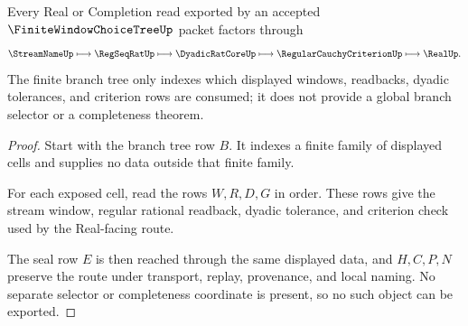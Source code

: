 \begin{theorem}
\label{thm:finite-window-choice-tree-real-handoff}
Every Real or Completion read exported by an accepted $\FiniteWindowChoiceTreeUp$ packet factors through
$$
\StreamNameUp \longmapsto \RegSeqRatUp \longmapsto \DyadicRatCoreUp \longmapsto \RegularCauchyCriterionUp \longmapsto \RealUp .
$$
The finite branch tree only indexes which displayed windows, readbacks, dyadic tolerances, and criterion rows are consumed; it does not provide a global branch selector or a completeness theorem.
\end{theorem}
\begin{proof}
Start with the branch tree row $B$. It indexes a finite family of displayed cells and supplies no data outside that finite family.

For each exposed cell, read the rows $W,R,D,G$ in order. These rows give the stream window, regular rational readback, dyadic tolerance, and criterion check used by the Real-facing route.

The seal row $E$ is then reached through the same displayed data, and $H,C,P,N$ preserve the route under transport, replay, provenance, and local naming. No separate selector or completeness coordinate is present, so no such object can be exported.
\end{proof}




